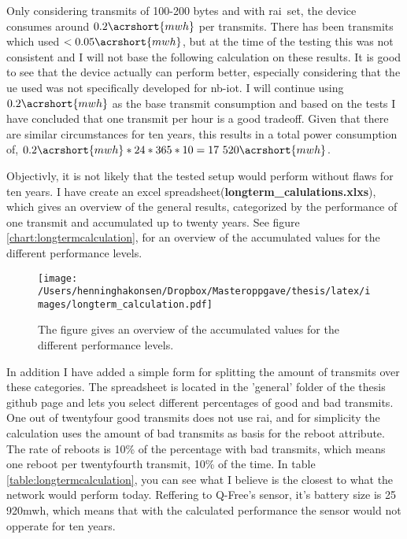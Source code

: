 \documentclass[USenglish]{ifimaster}  %
\begin{document}
Only considering transmits of 100-200 bytes and with \acrshort{rai} set, the device consumes around ${0.2 \acrshort{mwh}}$ per transmits\cite{online:result8}. There has been transmits which used ${<0.05 \acrshort{mwh}}$\cite{online:result12}, but at the time of the testing this was not consistent and I will not base the following calculation on these results. It is good to see that the device actually can perform better, especially considering that the \acrshort{ue} used was not specifically developed for \acrshort{nb-iot}.
I will continue using ${0.2 \acrshort{mwh}}$ as the base transmit consumption and based on the tests I have concluded that one transmit per hour is a good tradeoff. Given that there are similar circumstances for ten years, this results in a total power consumption of, ${0.2\acrshort{mwh} * 24 * 365 * 10 = 17 520 \acrshort{mwh}}$.

Objectivly, it is not likely that the tested setup would perform without flaws for ten years. I have create an excel spreadsheet(\textbf{longterm\_calulations.xlxs}), which gives an overview of the general results, categorized by the performance of one transmit and accumulated up to twenty years. See figure \vref{chart:longtermcalculation}, for an overview of the accumulated values for the different performance levels.

\begin{figure}[H]
  \centering
  \texttt{[image: /Users/henninghakonsen/Dropbox/Masteroppgave/thesis/latex/images/longterm\_calculation.pdf]}
  \caption[Long-term accumulated performance chart]{The figure gives an overview of the accumulated values for the different performance levels.}
  \label{chart:longtermcalculation}
\end{figure}

In addition I have added a simple form for splitting the amount of transmits over these categories. The spreadsheet is located in the 'general' folder of the thesis github page and lets you select different percentages of good and bad transmits. One out of twentyfour good transmits does not use \acrshort{rai}, and for simplicity the calculation uses the amount of bad transmits as basis for the reboot attribute. The rate of reboots is 10\% of the percentage with bad transmits, which means one reboot per twentyfourth transmit, 10\% of the time. In table \vref{table:longtermcalculation}, you can see what I believe is the closest to what the network would perform today. Reffering to Q-Free's sensor, it's battery size is 25 920\acrshort{mwh}, which means that with the calculated performance the sensor would not opperate for ten years.
\end{document}
